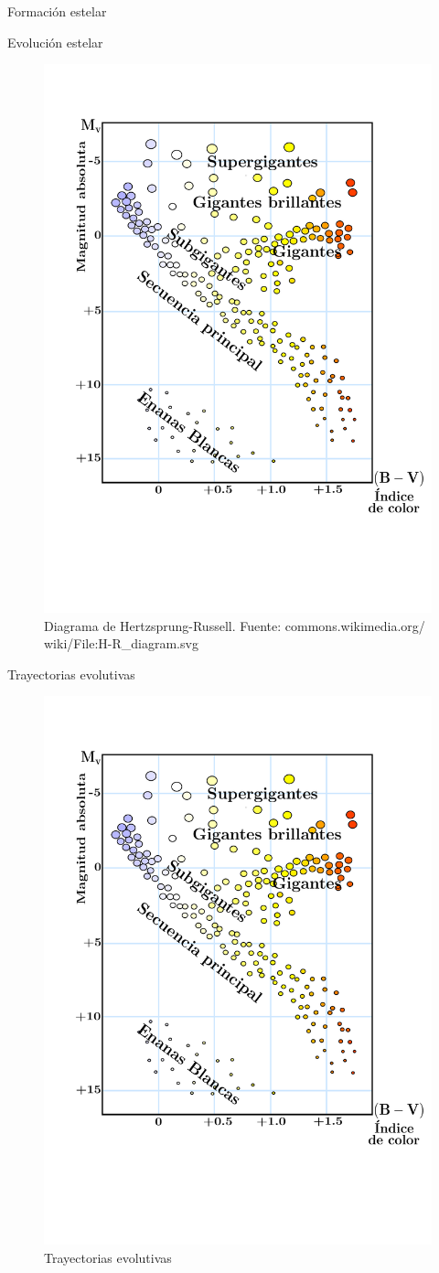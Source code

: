 \documentclass[11pt]{beamer}
\begin{document}
\begin{frame}{Formación estelar}
\begin{figure}
\begin{minipage}{.52\linewidth}
    \end{minipage}
    \end{figure}
\end{frame}


\begin{frame}{Evolución estelar}
\begin{figure}
    \centering
    \includegraphics[page=1,width=0.55\linewidth]{H-R_diagram_1.pdf}
    \caption{\centering Diagrama de Hertzsprung-Russell. Fuente: commons.wikimedia.org/
    wiki/File:H-R\_diagram.svg}
\end{figure}
    
\end{frame}

\begin{frame}{Trayectorias evolutivas}
    \begin{figure}
    \centering
    \includegraphics[page=2,width=0.55\linewidth]{H-R_diagram_1.pdf}
    \caption{Trayectorias evolutivas}
\end{figure}
\end{frame}
\end{document}
